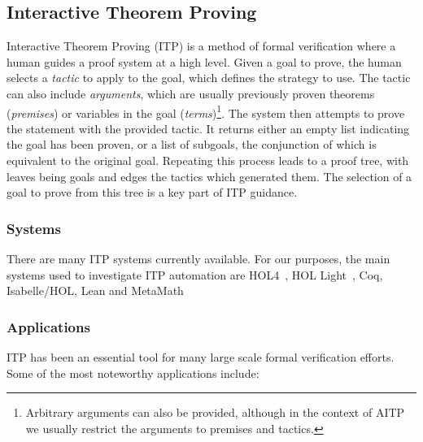 \documentclass{article}
\begin{document}
    \subsection{Interactive Theorem Proving}\label{subsec:interactive-theorem-proving}
    Interactive Theorem Proving (ITP) is a method of formal verification where a human guides a proof system at a high level.
    Given a goal to prove, the human selects a \textit{tactic} to apply to the goal, which defines the strategy to use.
    The tactic can also include \textit{arguments}, which are usually previously proven theorems (\textit{premises}) or variables in the goal (\textit{terms})\footnote{Arbitrary arguments can also be provided, although in the context of AITP we usually restrict the arguments to premises and tactics.}.
    The system then attempts to prove the statement with the provided tactic.
    It returns either an empty list indicating the goal has been proven, or a list of subgoals, the conjunction of which is equivalent to the original goal.
    Repeating this process leads to a proof tree, with leaves being goals and edges the tactics which generated them.
    The selection of a goal to prove from this tree is a key part of ITP guidance.

    \subsubsection{Systems}
    There are many ITP systems currently available.
    For our purposes, the main systems used to investigate ITP automation are HOL4~\cite{slind_brief_2008}, HOL Light~\cite{harrison_hol_2009}, Coq\cite{paulin-mohring_introduction_2012}, Isabelle/HOL\cite{paulson_isabelle_1994}, Lean\cite{felty_lean_2015} and MetaMath\cite{megill_metamath_2019}

    \subsubsection{Applications}
    ITP has been an essential tool for many large scale formal verification efforts.
    Some of the most noteworthy applications include:
\end{document}
